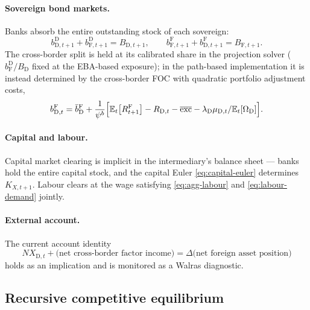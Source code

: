 \documentclass[11pt]{article}
\numberwithin{equation}{section}
\newcommand{\E}{\mathbb{E}}
\newcommand{\D}{\mathrm{D}}
\newcommand{\F}{\mathrm{F}}
\theoremstyle{definition}
\theoremstyle{plain}
\theoremstyle{remark}
\begin{document}
\paragraph{Sovereign bond markets.} Banks absorb the entire outstanding stock of each
sovereign:
\begin{equation}
b^{\D}_{\D,t+1}+b^{\D}_{\F,t+1}=B_{\D,t+1},
\qquad
b^{\F}_{\F,t+1}+b^{\F}_{\D,t+1}=B_{\F,t+1}.
\label{eq:bond-clearing}
\end{equation}
The cross-border split is held at its calibrated share in the projection solver
($b^{\D}_{\F}/B_\D$ fixed at the EBA-based exposure); in the path-based
implementation it is instead determined by the cross-border FOC with quadratic
portfolio adjustment costs,
\begin{equation}
b^{\F}_{\D,t}=\bar b^{\F}_{\D}
+\frac{1}{\psi^{b}}\Bigl[\E_t\bigl[R^{\F}_{t+1}\bigr]-R_{\D,t}
-\overline{\mathrm{exc}}-\lambda_\D\mu_{\D,t}/\E_t[\Omega_\D]\Bigr].
\label{eq:xborder-foc}
\end{equation}

\paragraph{Capital and labour.} Capital market clearing is implicit in the
intermediary's balance sheet --- banks hold the entire capital stock, and the
capital Euler \eqref{eq:capital-euler} determines $K_{X,t+1}$. Labour clears at the
wage satisfying \eqref{eq:agg-labour} and \eqref{eq:labour-demand} jointly.

\paragraph{External account.} The current account identity
\begin{equation}
NX_{\D,t}+\bigl(\text{net cross-border factor income}\bigr)
=\Delta\bigl(\text{net foreign asset position}\bigr)
\label{eq:ca}
\end{equation}
holds as an implication and is monitored as a Walras diagnostic.

\subsection{Recursive competitive equilibrium}
\end{document}
